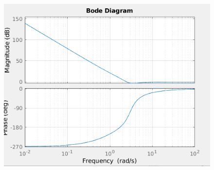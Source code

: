 \documentclass[12pt,a4paper]{article}
\begin{document}
	\begin{figure}[h!]
		\centering
		\includegraphics[scale=0.6]{./images/bode45tot.png}
	\end{figure}
	\newpage
\end{document}
